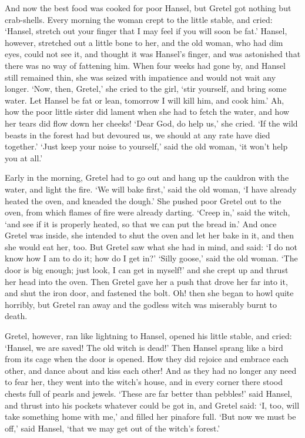 \documentclass[oneside,11pt]{book} %
\begin{document}
And now the best food was cooked for poor Hansel, but Gretel got nothing but crab-shells. Every morning the woman crept to the little stable, and cried: `Hansel, stretch out your finger that I may feel if you will soon be fat.' Hansel, however, stretched out a little bone to her, and the old woman, who had dim eyes, could not see it, and thought it was Hansel's finger, and was astonished that there was no way of fattening him. When four weeks had gone by, and Hansel still remained thin, she
was seized with impatience and would not wait any longer. `Now, then, Gretel,' she cried to the girl, `stir yourself, and bring some water. Let Hansel be fat or lean, tomorrow I will kill him, and cook him.' Ah, how the poor little sister did lament when she had to fetch the water, and how her tears did flow down her cheeks! `Dear God, do help us,' she cried. `If the wild beasts in the forest had but devoured us, we should at any rate have died together.' `Just keep your noise to yourself,' said the old woman, `it won't help you at all.'

Early in the morning, Gretel had to go out and hang up the cauldron with the water, and light the fire. `We will bake first,' said the old woman, `I have already heated the oven, and kneaded the dough.' She pushed poor Gretel out to the oven, from which flames of fire were already darting. `Creep in,' said the witch, `and see if it is properly heated, so that we can put the bread in.' And once Gretel was inside, she intended to shut the oven and let her bake in it, and then she would eat her, too. But Gretel saw what she had in mind, and said: `I do not know how I am to do it; how do I get in?' `Silly goose,' said the old woman. `The door is big enough; just look, I can get in myself!' and she crept up and thrust her head into the oven. Then Gretel gave her a push that drove her far into it, and shut the iron door, and fastened the bolt. Oh! then she began to howl quite horribly, but Gretel ran away and the godless witch was miserably burnt to death.

Gretel, however, ran like lightning to Hansel, opened his little stable, and cried: `Hansel, we are saved! The old witch is dead!' Then Hansel sprang like a bird from its cage when the door is opened. How they did rejoice and embrace each other, and dance about and kiss each other! And as they had no longer any need to fear her, they went into the witch's house, and in every corner there stood chests full of pearls and jewels. `These are far better than pebbles!' said Hansel, and thrust into his
pockets whatever could be got in, and Gretel said: `I, too, will take something home with me,' and filled her pinafore full. `But now we must be off,' said Hansel, `that we may get out of the witch's forest.'
\end{document}
